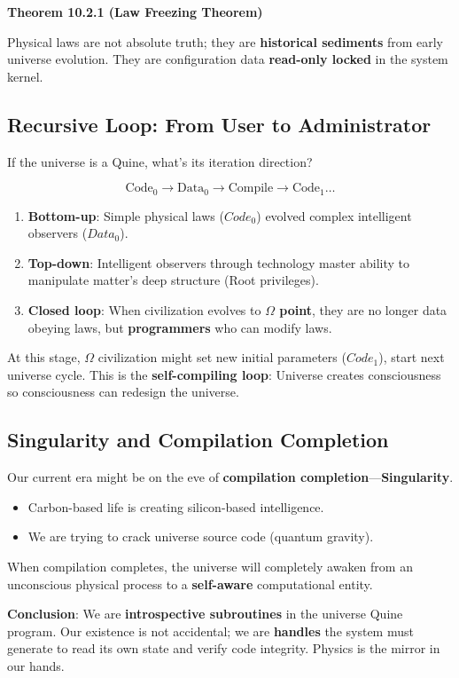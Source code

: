 \textbf{Theorem 10.2.1 (Law Freezing Theorem)}

Physical laws are not absolute truth; they are \textbf{historical sediments} from early universe evolution. They are configuration data \textbf{read-only locked} in the system kernel.

\subsection{Recursive Loop: From User to Administrator}

If the universe is a Quine, what's its iteration direction?

\[
\text{Code}_0 \to \text{Data}_0 \to \text{Compile} \to \text{Code}_1 \dots
\]

\begin{enumerate}
\item \textbf{Bottom-up}: Simple physical laws ($Code_0$) evolved complex intelligent observers ($Data_0$).
\item \textbf{Top-down}: Intelligent observers through technology master ability to manipulate matter's deep structure (Root privileges).
\item \textbf{Closed loop}: When civilization evolves to \textbf{$\Omega$ point}, they are no longer data obeying laws, but \textbf{programmers} who can modify laws.
\end{enumerate}

At this stage, $\Omega$ civilization might set new initial parameters ($Code_1$), start next universe cycle.
This is the \textbf{self-compiling loop}: Universe creates consciousness so consciousness can redesign the universe.

\subsection{Singularity and Compilation Completion}

Our current era might be on the eve of \textbf{compilation completion}---\textbf{Singularity}.
\begin{itemize}
\item Carbon-based life is creating silicon-based intelligence.
\item We are trying to crack universe source code (quantum gravity).
\end{itemize}

When compilation completes, the universe will completely awaken from an unconscious physical process to a \textbf{self-aware} computational entity.

\textbf{Conclusion}:
We are \textbf{introspective subroutines} in the universe Quine program. Our existence is not accidental; we are \textbf{handles} the system must generate to read its own state and verify code integrity.
Physics is the mirror in our hands.
